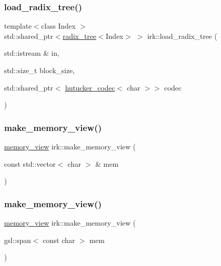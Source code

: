 \mbox{\label{namespaceirk_a11724f6a30a7fb17f24d0941fa00568d}} 
\subsubsection{\texorpdfstring{load\+\_\+radix\+\_\+tree()}{load\_radix\_tree()}}
{\footnotesize\ttfamily template$<$class Index $>$ \\
std\+::shared\+\_\+ptr$<$\mbox{\hyperlink{classirk_1_1radix__tree}{radix\+\_\+tree}}$<$Index$>$ $>$ irk\+::load\+\_\+radix\+\_\+tree (\begin{DoxyParamCaption}\item[{std\+::istream \&}]{in,  }\item[{std\+::size\+\_\+t}]{block\+\_\+size,  }\item[{std\+::shared\+\_\+ptr$<$ \mbox{\hyperlink{classirk_1_1hutucker__codec}{hutucker\+\_\+codec}}$<$ char $>$$>$}]{codec }\end{DoxyParamCaption})}

\mbox{\label{namespaceirk_a7065a12b7b7c5dd5aad84394da95871b}} 
\subsubsection{\texorpdfstring{make\+\_\+memory\+\_\+view()}{make\_memory\_view()}\hspace{0.1cm}{\footnotesize\ttfamily [1/4]}}
{\footnotesize\ttfamily \mbox{\hyperlink{classirk_1_1memory__view}{memory\+\_\+view}} irk\+::make\+\_\+memory\+\_\+view (\begin{DoxyParamCaption}\item[{const std\+::vector$<$ char $>$ \&}]{mem }\end{DoxyParamCaption})\hspace{0.3cm}{\ttfamily [inline]}}

\mbox{\label{namespaceirk_ac123106f771ea0ef0ee855f8ee98bc2b}} 
\subsubsection{\texorpdfstring{make\+\_\+memory\+\_\+view()}{make\_memory\_view()}\hspace{0.1cm}{\footnotesize\ttfamily [2/4]}}
{\footnotesize\ttfamily \mbox{\hyperlink{classirk_1_1memory__view}{memory\+\_\+view}} irk\+::make\+\_\+memory\+\_\+view (\begin{DoxyParamCaption}\item[{gsl\+::span$<$ const char $>$}]{mem }\end{DoxyParamCaption})\hspace{0.3cm}{\ttfamily [inline]}}

